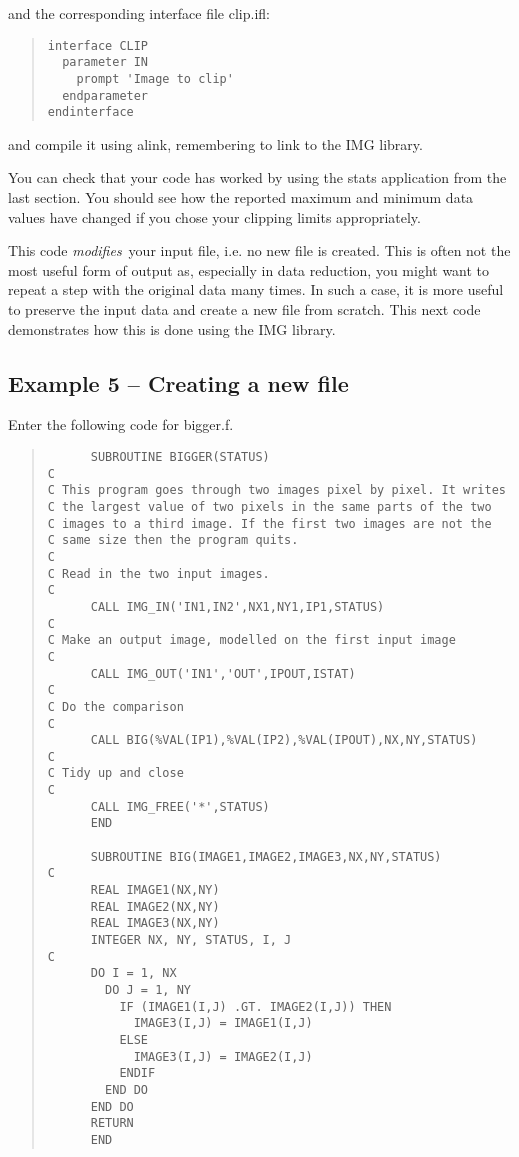 and the corresponding interface file {\sf clip.ifl}:

\begin{quote}
{\small
\begin{verbatim}
interface CLIP
  parameter IN
    prompt 'Image to clip'
  endparameter
endinterface
\end{verbatim}
}
\end{quote}

and compile it using {\sf alink}, remembering to link to the IMG library.

You can check that your code has worked by using the {\sf stats} application
from the last section. You should see how the reported maximum and
minimum data values have changed if you chose your clipping limits
appropriately.

This code {\em modifies}\, your input file, i.e. no new file is created. This
is often not the most useful form of output as, especially in data
reduction, you might want to repeat a step with the original data many
times. In such a case, it is more useful to preserve the input data and
create a new file from scratch. This next code demonstrates how this is
done using the {\sf IMG} library.

\subsection{Example 5 -- Creating a new file}

Enter the following code for {\sf bigger.f}.

\begin{quote}
{\small
\begin{verbatim}
      SUBROUTINE BIGGER(STATUS)
C
C This program goes through two images pixel by pixel. It writes
C the largest value of two pixels in the same parts of the two
C images to a third image. If the first two images are not the
C same size then the program quits.
C
C Read in the two input images.
C
      CALL IMG_IN('IN1,IN2',NX1,NY1,IP1,STATUS)
C
C Make an output image, modelled on the first input image
C
      CALL IMG_OUT('IN1','OUT',IPOUT,ISTAT)
C
C Do the comparison
C
      CALL BIG(%VAL(IP1),%VAL(IP2),%VAL(IPOUT),NX,NY,STATUS)
C
C Tidy up and close
C
      CALL IMG_FREE('*',STATUS)
      END

      SUBROUTINE BIG(IMAGE1,IMAGE2,IMAGE3,NX,NY,STATUS)
C
      REAL IMAGE1(NX,NY)
      REAL IMAGE2(NX,NY)
      REAL IMAGE3(NX,NY)
      INTEGER NX, NY, STATUS, I, J
C
      DO I = 1, NX
        DO J = 1, NY
          IF (IMAGE1(I,J) .GT. IMAGE2(I,J)) THEN
            IMAGE3(I,J) = IMAGE1(I,J)
          ELSE
            IMAGE3(I,J) = IMAGE2(I,J)
          ENDIF
        END DO
      END DO
      RETURN
      END
\end{verbatim}
}
\end{quote}


